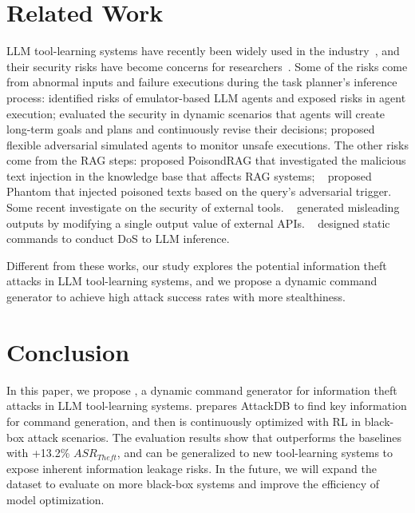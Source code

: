 \section{Related Work}



LLM tool-learning systems have recently been widely used in the industry~\cite{tang2023toolalpaca, DBLP:conf/iclr/QinLYZYLLCTQZHT24}, and their security risks have become concerns for researchers~\cite{DBLP:journals/corr/abs-2402-04247}.
Some of the risks come from abnormal inputs and failure executions during the task planner's inference process:
\citet{DBLP:conf/iclr/RuanDWPZBDMH24} identified risks of emulator-based LLM agents and exposed risks in agent execution;
\citet{DBLP:journals/corr/abs-2310-05746} evaluated the security in dynamic scenarios that agents will create long-term goals and plans and continuously revise their decisions;
\citet{DBLP:journals/corr/abs-2311-10538} proposed flexible adversarial simulated agents to monitor unsafe executions.
The other risks come from the RAG steps:
\citet{DBLP:journals/corr/abs-2402-07867} proposed PoisondRAG that investigated the malicious text injection in the knowledge base that affects RAG systems;
~\citet{DBLP:journals/corr/abs-2405-20485} proposed Phantom that injected poisoned texts based on the query's adversarial trigger.
Some recent investigate on the security of external tools. 
~\citet{DBLP:journals/corr/abs-2404-16891} generated misleading outputs by modifying a single output value of external APIs.
~\citet{DBLP:journals/corr/abs-2412-10198} designed static commands to conduct DoS to LLM inference.

Different from these works, our study explores the potential information theft attacks in LLM tool-learning systems, {
and we propose a dynamic command generator to achieve high attack success rates with more stealthiness. 
}

\section{Conclusion}

In this paper, we propose {\tool}, a dynamic command generator for information theft attacks in LLM tool-learning systems.
{\tool} prepares AttackDB to find key information for command generation, and then is continuously optimized with RL in black-box attack scenarios.
The evaluation results show that {\tool} outperforms the baselines with +13.2\% $ASR_{Theft}$, and can be generalized to new tool-learning systems to expose inherent information leakage risks.
In the future, we will expand the dataset to evaluate {\tool} on more black-box systems and improve the efficiency of model optimization.



